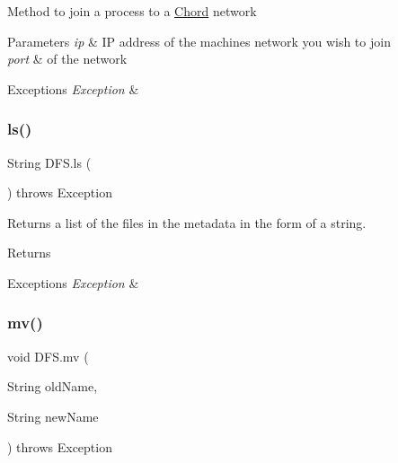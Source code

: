 Method to join a process to a \mbox{\hyperlink{class_chord}{Chord}} network 
\begin{DoxyParams}{Parameters}
{\em ip} & IP address of the machine\textquotesingle{}s network you wish to join \\
\hline
{\em port} & of the network \\
\hline
\end{DoxyParams}

\begin{DoxyExceptions}{Exceptions}
{\em Exception} & \\
\hline
\end{DoxyExceptions}
\mbox{\label{class_d_f_s_a753e09aab8e500f333585f1a6ee865e1}} 
\subsubsection{\texorpdfstring{ls()}{ls()}}
{\footnotesize\ttfamily String D\+F\+S.\+ls (\begin{DoxyParamCaption}{ }\end{DoxyParamCaption}) throws Exception\hspace{0.3cm}{\ttfamily [inline]}}

Returns a list of the files in the metadata in the form of a string. \begin{DoxyReturn}{Returns}

\end{DoxyReturn}

\begin{DoxyExceptions}{Exceptions}
{\em Exception} & \\
\hline
\end{DoxyExceptions}
\mbox{\label{class_d_f_s_a7b0d44e11c6176a71d040919b6fe1d96}} 
\subsubsection{\texorpdfstring{mv()}{mv()}}
{\footnotesize\ttfamily void D\+F\+S.\+mv (\begin{DoxyParamCaption}\item[{String}]{old\+Name,  }\item[{String}]{new\+Name }\end{DoxyParamCaption}) throws Exception\hspace{0.3cm}{\ttfamily [inline]}}

